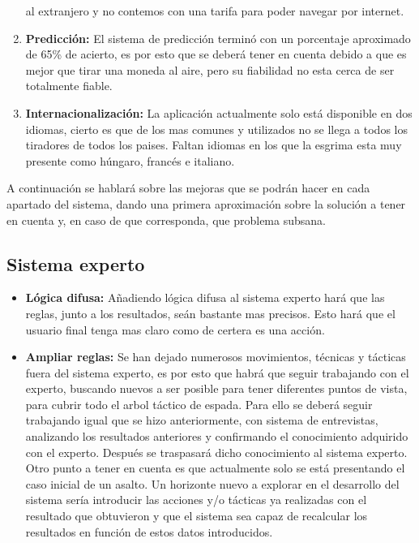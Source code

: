 \begin{enumerate}
    al extranjero y no contemos con una tarifa para poder navegar por internet.
  \item \textbf{Predicción:} El sistema de predicción terminó con un porcentaje
    aproximado de 65\% de acierto, es por esto que se deberá tener en cuenta
    debido a que es mejor que tirar una moneda al aire, pero su fiabilidad
    no esta cerca de ser totalmente fiable.
  \item \textbf{Internacionalización:} La aplicación actualmente solo está
    disponible en dos idiomas, cierto es que de los mas comunes y utilizados
    no se llega a todos los tiradores de todos los paises. Faltan idiomas
    en los que la esgrima esta muy presente como húngaro, francés e italiano.
\end{enumerate}

A continuación se hablará sobre las mejoras que se podrán hacer en cada apartado
del sistema, dando una primera aproximación sobre la solución a tener en cuenta y,
en caso de que corresponda, que problema subsana.

\subsection{Sistema experto}

\begin{itemize}
  \item \textbf{Lógica difusa:} Añadiendo lógica difusa al sistema experto hará que las reglas,
    junto a los resultados, seán bastante mas precisos. Esto hará que el usuario final
    tenga mas claro como de certera es una acción.

  \item \textbf{Ampliar reglas:} Se han dejado numerosos movimientos, técnicas y tácticas
    fuera del sistema experto, es por esto que habrá que seguir trabajando con el
    experto, buscando nuevos a ser posible para tener diferentes puntos de vista,
    para cubrir todo el arbol táctico de espada. Para ello se deberá seguir
    trabajando igual que se hizo anteriormente, con sistema de entrevistas, analizando
    los resultados anteriores y confirmando el conocimiento adquirido con el experto.
    Después se traspasará dicho conocimiento al sistema experto. Otro punto a tener
    en cuenta es que actualmente solo se está presentando el caso inicial de un
    asalto. Un horizonte nuevo a explorar en el desarrollo del sistema sería
    introducir las acciones y/o tácticas ya realizadas con el resultado que obtuvieron
    y que el sistema sea capaz de recalcular los resultados en función de estos
    datos introducidos.
\end{itemize}

